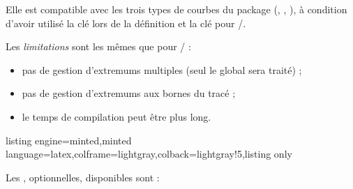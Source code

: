 \documentclass[11pt,a4paper]{ltxdoc}
\begin{document}
\smallskip

Elle est compatible avec les trois types de courbes du package (, , ), à condition d'avoir utilisé la clé  lors de la définition et la clé  pour /.

\smallskip

{\small\faBomb} Les \textit{limitations} sont les mêmes que pour / :

\begin{itemize}
  \item pas de gestion d'extremums multiples (seul le global sera traité) ;
  \item pas de gestion d'extremums aux bornes du tracé ;
  \item le temps de compilation peut être plus long.
\end{itemize}

\begin{tcblisting}{listing engine=minted,minted language=latex,colframe=lightgray,colback=lightgray!5,listing only}
\end{tcblisting}

Les \MontreCode{[clés]}, optionnelles, disponibles sont :
\end{document}
